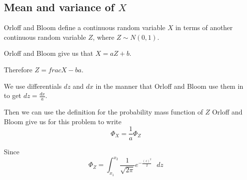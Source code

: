 \documentclass[a4paper,11pt]{article}
\begin{document}
\subsection{Mean and variance of $X$}
Orloff and Bloom define a continuous random variable $X$ in terms of another
continuous random variable $Z$, where $Z \sim N \left(0, 1 \right)$.

Orloff and Bloom give us that $X = aZ + b$.

Therefore $Z = frac{X-b}{a}$.

We use differentials $dz$ and $dx$ in the manner that Orloff and
Bloom use them in \cite{reading5d} to get $dz = \frac{dx}{a}$.

Then we can use the definition for the probability mass function of $Z$ Orloff
and Bloom give us for this problem to write
\begin{equation}
	\Phi_X = \frac{1}{a} \Phi_Z
\end{equation}

Since
\begin{equation}
	\Phi_Z = \int_{x_{1}}^{x_{2}} \frac{1}{\sqrt{2\pi}} e^{-\frac{\left( z \right)^{2}}{2}} \text{ }dz
\end{equation}


\printbibliography{}
\end{document}
